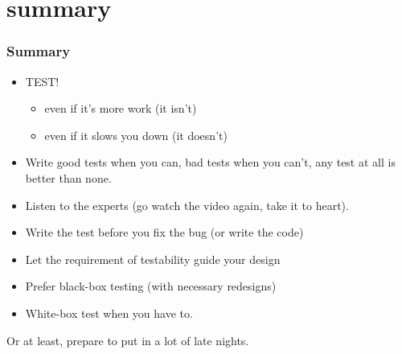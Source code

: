 \section{summary}
\begin{frame}[fragile,t]
\frametitle{Summary}

\begin{itemize}
\item TEST!
\begin{itemize}
  \item even if it's more work (it isn't)
  \item even if it slows you down (it doesn't)
\end{itemize}
\pause{}
\item Write good tests when you can, bad tests when you can't, any
  test at all is better than none.
\pause{}
\item Listen to the experts (go watch the video again, take it to heart).
\pause{}
\item Write the test before you fix the bug (or write the code)
\pause{}
\item Let the requirement of testability guide your design
\item Prefer black-box testing (with necessary redesigns)
\item White-box test when you have to.
\end{itemize}
\vskip 12pt

\begin{center}
\end{center}


\begin{center}

\pause{}

Or at least, prepare to put in a lot of late nights.
\end{center}

\end{frame}









